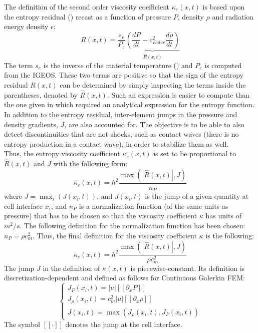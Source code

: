 \noindent 
The definition of the second order viscosity coefficient $\kappa_e(x,t)$ is based upon the entropy residual () recast as a function of pressure $P$, density $\rho$ and radiation energy density $\epsilon$:
\begin{equation}
\label{eq:equation9}
R(x,t) = \frac{s_e}{P_e} \underbrace{ \left( \frac{dP}{dt} - c_{Euler}^2 \frac{d\rho}{dt} \right)}_\textrm{$\hat{R}(x,t)$}
\end{equation}
The term $s_e$ is the inverse of the material temperature () and $P_e$ is computed from the IGEOS. These two terms are positive so that the sign of the entropy residual $R(x,t)$ can be determined by simply inspecting the terms inside the parentheses, denoted by $\hat{R}(x,t)$. Such an expression is easier to compute than the one given in  which required an analytical expression for the entropy function. In addition to the entropy residual, inter-element jumps in the pressure and density gradients, $J$, are also accounted for. The objective is to be able to also detect discontinuities that are not shocks, such as contact waves (there is no entropy production in a contact wave), in order to stabilize them as well. \\
Thus, the entropy viscosity coefficient $\kappa_e(x,t)$ is set to be proportional to $\hat{R}(x,t)$ and $J$ with the following form: 
\begin{equation}
\label{eq:equation12}
\kappa_e(x,t) = h^2 \frac{\max (|\hat{R}(x,t)|, J)}{n_P}
\end{equation} 
where $J = \max_i (J(x_i,t))$, and $J(x_i,t)$ is the jump of a given quantity at cell interface $x_i$, and $n_P$ is a normalization function (of the same units as pressure) that has to be chosen so that the viscosity coefficient $\kappa$ has units of $m^2/s$. The following definition for the normalization function has been chosen: $n_P = \rho c_m^2$. Thus, the final definition for the viscosity coefficient $\kappa$ is the following:
\begin{equation}
\label{eq:equation12bis}
\kappa_e(x,t) = h^2 \frac{\max (|\hat{R}(x,t)|, J)}{\rho c_m^2}
\end{equation} 
The jump $J$ in the definition of $\kappa(x,t)$ is piecewise-constant. Its definition is discretization-dependent and defined as follows for Continuous Galerkin FEM: 
\begin{equation}
\label{eq:equation12ter}
\left\{
\begin{array}{lll}
J_P(x_i,t) = |u| [[\partial_x P]]\\
J_{\rho}(x_i,t) = c_m^2 |u|  [[\partial_x \rho]] \\
J(x_i,t) = \max( J_{\rho}(x_i,t), J_{P}(x_i,t) )
\end{array}
\right.
\end{equation}
The symbol $[[ \cdot ]]$ denotes the jump at the cell interface.

